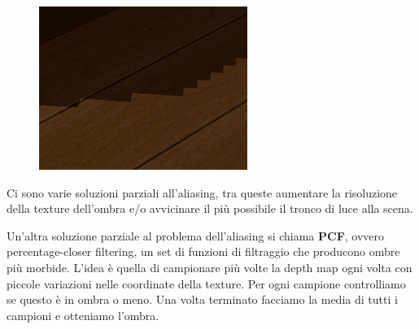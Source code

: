 \documentclass[12pt]{report}
\begin{document}
\begin{figure}[h]
    \centering
    \includegraphics{img/shadow_mapping_zoom.png}
\end{figure}

Ci sono varie soluzioni parziali all'aliasing, tra queste aumentare la risoluzione della texture dell'ombra e/o avvicinare il più possibile il tronco di luce alla scena.

Un'altra soluzione parziale al problema dell'aliasing si chiama \textbf{PCF}, ovvero percentage-closer filtering, un set di funzioni di filtraggio che producono ombre più morbide. L'idea è quella di campionare più volte la depth map ogni volta con piccole variazioni nelle coordinate della texture. Per ogni campione controlliamo se questo è in ombra o meno. Una volta terminato facciamo la media di tutti i campioni e otteniamo l'ombra.
\end{document}
